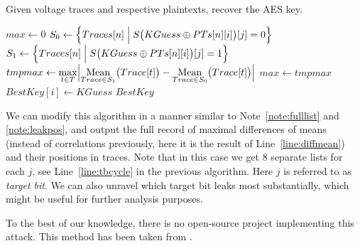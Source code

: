 	\begin{alg}
	\label{alg:bitwisedpa}
	Given voltage traces and respective plaintexts, recover the AES key.
		\begin{algorithmic}[1]
					\State $max \gets 0$
						 \label{line:tbcycle}
							\State $S_0 \gets \Bigl\{ Traces[n] \Bigm| S\bigl(KGuess\oplus PTs[n][i]\bigr)[j] = 0 \Bigr\}$ \label{line:s0}
							\State $S_1 \gets \Bigl\{ Traces[n] \Bigm| S\bigl(KGuess\oplus PTs[n][i]\bigr)[j] = 1 \Bigr\}$ \label{line:s1}
							\State $tmpmax \gets \max\limits_{t\in T} \Bigl| \operatorname*{Mean}\limits_{Trace\in S_1}\bigl(Trace[t]\bigr) - \operatorname*{Mean}\limits_{Trace\in S_0}\bigl(Trace[t]\bigr) \Bigr|$
								\label{line:diffmean}
								\State $max \gets tmpmax$
								\State $BestKey[i] \gets KGuess$
							\EndIf
						\EndFor
					\EndFor
				\EndFor
				\State\Return $BestKey$
			\EndFunction
		\end{algorithmic}
	\end{alg}
	
	\begin{note}
	\label{note:eightlists}
		We can modify this algorithm in a manner similar to Note~\ref{note:fulllist} and \ref{note:leakpos}, and output the full record of maximal differences of means (instead of correlations previously, here it is the result of Line~\ref{line:diffmean}) and their positions in traces. Note that in this case we get $8$ separate lists for each $j$, see Line~\ref{line:tbcycle} in the previous algorithm. Here $j$ is referred to as {\em target bit}. We can also unravel which target bit leaks most substantially, which might be useful for further analysis purposes.
	\end{note}
	
	To the best of our knowledge, there is no open-source project implementing this attack. This method has been taken from \cite{teuwen2015movfuscator}.
	